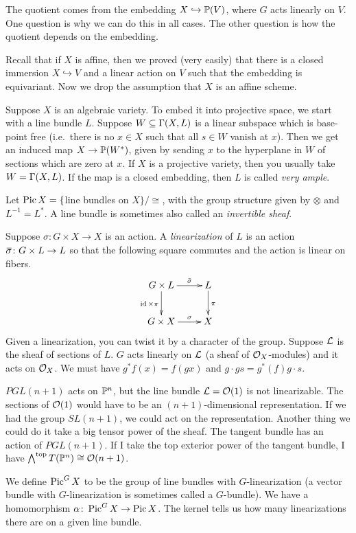 The quotient comes from the embedding $X\hookrightarrow \mathbb{P}(V)$, where $G$ acts linearly on $V$. One question is why we can do this in all cases. The other question is how the quotient depends on the embedding.

Recall that if $X$ is affine, then we proved (very easily) that there is a closed immersion $X\hookrightarrow V$ and a linear action on $V$ such that the embedding is equivariant. Now we drop the assumption that $X$ is an affine scheme.

Suppose $X$ is an algebraic variety. To embed it into projective space, we start with a line bundle $L$. Suppose $W\subseteq \Gamma(X,L)$ is a linear subspace which is base-point free (i.e.~there is no $x\in X$ such that all $s\in W$ vanish at $x$). Then we get an induced map $X\to \mathbb{P}(W^*)$, given by sending $x$ to the hyperplane in $W$ of sections which are zero at $x$. If $X$ is a projective variety, then you usually take $W=\Gamma(X,L)$. If the map is a closed embedding, then $L$ is called \emph{very ample}.

Let $\operatorname{Pic} X=\{$line bundles on $X\}/\cong$, with the group structure given by $\otimes$ and $L^{-1}=L^*$. A line bundle is sometimes also called an \emph{invertible sheaf}.

Suppose $\sigma\colon G\times X\to X$ is an action. A \emph{linearization} of $L$ is an action $\bbar \sigma\colon G\times L\to L$ so that the following square commutes and the action is linear on fibers.
\[\xymatrix{
 G\times L \ar[d]_{\id\times \pi} \ar[r]^-{\bar\sigma} & L\ar[d]^\pi\\
 G\times X\ar[r]^-\sigma & X
}\]
Given a linearization, you can twist it by a character of the group. Suppose $\mathcal{L}$ is the sheaf of sections of $L$. $G$ acts linearly on $\mathcal{L}$ (a sheaf of $\mathcal{O}_X$-modules) and it acts on $\mathcal{O}_X$. We must have $g^* f(x) = f(gx)$ and $g\cdot g s = g^*(f) g\cdot s$.

\begin{example}
 $PGL(n+1)$ acts on $\mathbb{P}^n$, but the line bundle $\mathcal{L}=\mathcal{O}(1)$ is not linearizable. The sections of $\mathcal{O}(1)$ would have to be an $(n+1)$-dimensional representation. If we had the group $SL(n+1)$, we could act on the representation. Another thing we could do it take a big tensor power of the sheaf. The tangent bundle has an action of $PGL(n+1)$. If I take the top exterior power of the tangent bundle, I have $\bigwedge^\text{top} T(\mathbb{P}^n) \cong \mathcal{O}(n+1)$.
\end{example}
We define $\operatorname{Pic}^G X$ to be the group of line bundles with $G$-linearization (a vector bundle with $G$-linearization is sometimes called a $G$-bundle). We have a homomorphism $\alpha\colon \operatorname{Pic}^G X\to \operatorname{Pic} X$. The kernel tells us how many linearizations there are on a given line bundle.

